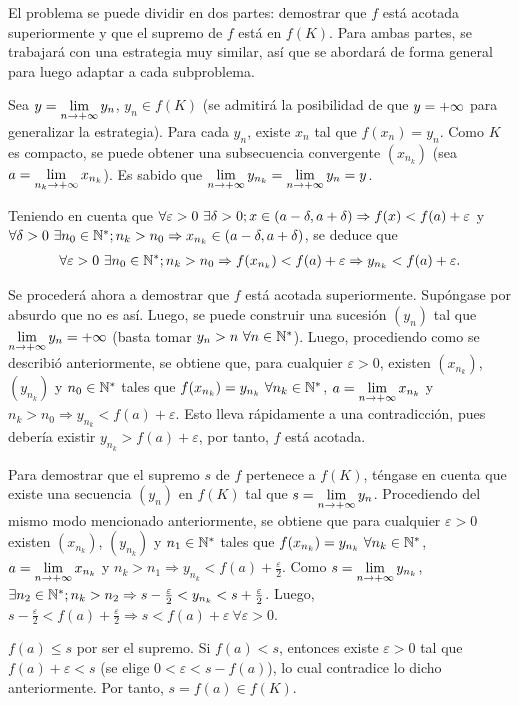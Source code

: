 
{
	El problema se puede dividir en dos partes: demostrar que $f$ está acotada superiormente y que el supremo de $f$ está en $f(K)$.
	Para ambas partes, se trabajará con una estrategia muy similar, así que se abordará de forma general para luego adaptar a cada subproblema.

	Sea $y = \limite{n}{y_n}$, $y_n\in f(K)$ (se admitirá la posibilidad de que $y=+\infty$ para generalizar la estrategia).
	Para cada $y_n$, existe $x_n$ tal que $f(x_n) = y_n$.
	Como $K$ es compacto, se puede obtener una subsecuencia convergente $(x_{n_k})$ (sea $a = \limite{n_k}{x_{n_k}}$).
	Es sabido que $\limite{n}{y_{n_k}} = \limite{n}{y_n} = y$.

	Teniendo en cuenta que
	$\forall\varepsilon>0\ \exists\delta>0; x\in\left(a-\delta,a+\delta\right)\Rightarrow f(x)<f(a)+\varepsilon$ y
	$\forall\delta>0\ \exists n_0\in\mathbb{N}^*; n_k > n_0 \Rightarrow x_{n_k}\in\left(a-\delta,a+\delta\right)$, se deduce que
	\begin{align*} \label{rel:magica}
		\forall\varepsilon>0\ \exists n_0\in\mathbb{N}^*; n_k>n_0 \Rightarrow f(x_{n_k}) < f(a) + \varepsilon \Rightarrow y_{n_k} < f(a) + \varepsilon .
	\end{align*}

	Se procederá ahora a demostrar que $f$ está acotada superiormente. Supóngase por absurdo que no es así. Luego, se puede construir una sucesión $(y_n)$ tal que $\limite{n}{y_n} = \pinf$ (basta tomar $y_n>n\ \forall n\in\mathbb{N}^*$).
	Luego, procediendo como se describió anteriormente, se obtiene que, para cualquier $\varepsilon>0$, existen $(x_{n_k})$, $(y_{n_k})$ y $n_0\in\mathbb{N}^*$ tales que $f(x_{n_k}) = y_{n_k}\ \forall n_k\in\mathbb{N}^*$, $a = \limite{n}{x_{n_k}}$ y $n_k>n_0\Rightarrow y_{n_k} < f(a)+\varepsilon$.
	Esto lleva rápidamente a una contradicción, pues debería existir $y_{n_k} > f(a)+\varepsilon$, por tanto, $f$ está acotada.

	Para demostrar que el supremo $s$ de $f$ pertenece a $f(K)$, téngase en cuenta que existe una secuencia $(y_n)$ en $f(K)$ tal que $s = \limite{n}{y_n}$.
	Procediendo del mismo modo mencionado anteriormente, se obtiene que para cualquier $\varepsilon>0$ existen $(x_{n_k})$, $(y_{n_k})$ y $n_1\in\mathbb{N}^*$ tales que $f(x_{n_k}) = y_{n_k}\ \forall n_k\in\mathbb{N}^*$, $a = \limite{n}{x_{n_k}}$ y $n_k>n_1\Rightarrow y_{n_k} < f(a)+\frac{\varepsilon}{2}$.
	Como $s = \limite{n}{y_{n_k}}$, $\exists n_2\in\mathbb{N}^*; n_k>n_2 \Rightarrow s-\frac{\varepsilon}{2}<y_{n_k}<s+\frac{\varepsilon}{2}$.
	Luego, $s-\frac{\varepsilon}{2}<f(a)+\frac{\varepsilon}{2} \Rightarrow s < f(a) + \varepsilon\ \forall\varepsilon>0$.
	
	$f(a) \leq s$ por ser el supremo. Si $f(a)<s$, entonces existe $\varepsilon>0$ tal que $f(a)+\varepsilon<s$ (se elige $0<\varepsilon<s-f(a)$), lo cual contradice lo dicho anteriormente.
	Por tanto, $s = f(a) \in f(K)$.
}